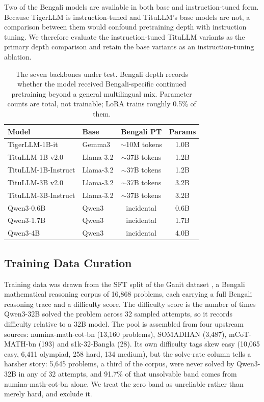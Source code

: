 Two of the Bengali models are available in both base and instruction-tuned
form. Because TigerLLM is instruction-tuned and TituLLM's base models are not, a
comparison between them would confound pretraining depth with instruction
tuning. We therefore evaluate the instruction-tuned TituLLM variants as the
primary depth comparison and retain the base variants as an instruction-tuning
ablation.

\begin{table}[htbp]
\caption{The seven backbones under test. Bengali depth records whether the model received Bengali-specific continued pretraining beyond a general multilingual mix. Parameter counts are total, not trainable; LoRA trains roughly 0.5\% of them.}
\label{tab:models}
\centering
\begin{tabular}{|l|l|c|c|}
\hline
\textbf{Model} & \textbf{Base} & \textbf{Bengali PT} & \textbf{Params} \\
\hline
TigerLLM-1B-it        & Gemma3      & $\sim$10M tokens & 1.0B \\
TituLLM-1B v2.0       & Llama-3.2   & $\sim$37B tokens & 1.2B \\
TituLLM-1B-Instruct   & Llama-3.2   & $\sim$37B tokens & 1.2B \\
TituLLM-3B v2.0       & Llama-3.2   & $\sim$37B tokens & 3.2B \\
TituLLM-3B-Instruct   & Llama-3.2   & $\sim$37B tokens & 3.2B \\
Qwen3-0.6B            & Qwen3       & incidental       & 0.6B \\
Qwen3-1.7B            & Qwen3       & incidental       & 1.7B \\
Qwen3-4B              & Qwen3       & incidental       & 4.0B \\
\hline
\end{tabular}
\end{table}

\subsection{Training Data Curation}

Training data was drawn from the SFT split of the Ganit dataset
\parencite{ganitllm}, a Bengali mathematical reasoning corpus of 16,868
problems, each carrying a full Bengali reasoning trace and a difficulty score.
The difficulty score is the number of times Qwen3-32B solved the problem across
32 sampled attempts, so it records difficulty relative to a 32B model. The pool
is assembled from four upstream sources: numina-math-cot-bn (13,160 problems),
SOMADHAN (3,487), mCoT-MATH-bn (193) and s1k-32-Bangla (28). Its own difficulty
tags skew easy (10,065 easy, 6,411 olympiad, 258 hard, 134 medium), but the
solve-rate column tells a harsher story: 5,645 problems, a third of the corpus,
were never solved by Qwen3-32B in any of 32 attempts, and 91.7\% of that
unsolvable band comes from numina-math-cot-bn alone. We treat the zero band as
unreliable rather than merely hard, and exclude it.

